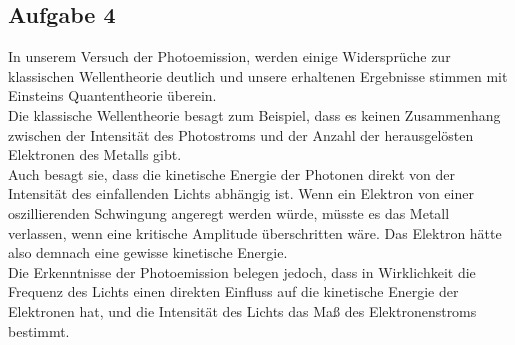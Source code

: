 \subsection{Aufgabe 4}

In unserem Versuch der Photoemission, werden einige Widersprüche zur klassischen Wellentheorie deutlich und unsere erhaltenen Ergebnisse stimmen mit Einsteins Quantentheorie überein.\\

Die klassische Wellentheorie besagt zum Beispiel, dass es keinen Zusammenhang zwischen der Intensität des Photostroms und der Anzahl der herausgelösten Elektronen des Metalls gibt.\\

Auch besagt sie, dass die kinetische Energie der Photonen direkt von der Intensität des einfallenden Lichts abhängig ist. Wenn ein Elektron von einer oszillierenden Schwingung angeregt werden würde, müsste es das Metall verlassen, wenn eine kritische Amplitude überschritten wäre. Das Elektron hätte also demnach eine gewisse kinetische Energie.
\\
Die Erkenntnisse der Photoemission belegen jedoch, dass in Wirklichkeit die Frequenz des Lichts einen direkten Einfluss auf die kinetische Energie der Elektronen hat, und die Intensität des Lichts das Maß des Elektronenstroms bestimmt.